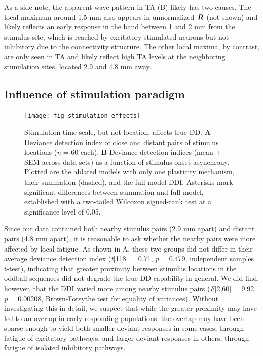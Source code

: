 \documentclass[9pt,lineno,onehalfspacing]{elife}
\newcommand{\dev}{\textit{A-as-dev}}
\newcommand{\msc}{\textit{A-in-con}}
\newcommand{\std}{\textit{A-as-std}}
\newcommand{\ifstringequal}[4]{%
  \ifnum\pdfstrcmp{#1}{#2}=0
  #3%
  \else
  #4%
  \fi
}
\newcommand{\seqreplace}[1]{\ifstringequal{dev}{#1}{\dev}{%
    \ifstringequal{std}{#1}{\std}{%
        \ifstringequal{msc}{#1}{\msc}{#1}%
    }%
}}
\newcommand{\R}[3][]{{}^{\seqreplace{#1}}_{}\boldsymbol R^{#2}_{#3}}
\begin{document}
As a side note, the apparent wave pattern in TA (B) likely has two causes. The local maximum around 1.5 mm also appears in unnormalized $\R{}{}$ (not shown) and likely reflects an early response in the band between 1 and 2 mm from the stimulus site, which is reached by excitatory stimulated neurons but not inhibitory due to the connectivity structure. The other local maxima, by contrast, are only seen in TA and likely reflect high TA levels at the neighboring stimulation sites, located 2.9 and 4.8 mm away.

\subsection{Influence of stimulation paradigm}

\begin{figure}
    \texttt{[image: fig-stimulation-effects]}
    \caption{%
        Stimulation time scale, but not location, affects true DD.
        \textbf{A} Deviance detection index of close and distant pairs of stimulus locations (\textit{n} = 60 each).
        \textbf{B} Deviance detection indices (mean +- SEM across data sets) as a function of stimulus onset asynchrony. Plotted are the ablated models with only one plasticity mechanism, their summation (dashed), and the full model DDI. Asterisks mark significant differences between summation and full model, established with a two-tailed Wilcoxon signed-rank test at a significance level of 0.05.
    }
    \label{fig:stimulation-effects}
\end{figure}

Since our data contained both nearby stimulus pairs (2.9 mm apart) and distant pairs (4.8 mm apart), it is reasonable to ask whether the nearby pairs were more affected by local fatigue. As shown in A, these two groups did not differ in their average deviance detection index (\textit{t}[118] = 0.71, \textit{p} = 0.479, independent samples t-test), indicating that greater proximity between stimulus locations in the oddball sequences did not degrade the true DD capability in general. We did find, however, that the DDI varied more among nearby stimulus pairs (\textit{F}[2,60] = 9.92, \textit{p} = 0.00208, Brown-Forsythe test for equality of variances). Without investigating this in detail, we suspect that while the greater proximity may have led to an overlap in early-responding populations, the overlap may have been sparse enough to yield both smaller deviant responses in some cases, through fatigue of excitatory pathways, and larger deviant responses in others, through fatigue of isolated inhibitory pathways.
\end{document}
